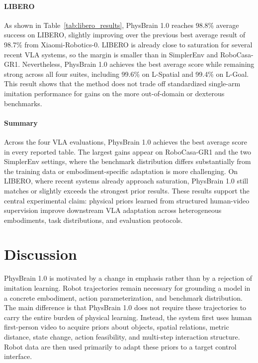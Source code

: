 \paragraph{LIBERO}
As shown in Table~\ref{tab:libero_results}, PhysBrain 1.0 reaches 98.8\% average success on LIBERO, slightly improving over the previous best average result of 98.7\% from Xiaomi-Robotics-0. LIBERO is already close to saturation for several recent VLA systems, so the margin is smaller than in SimplerEnv and RoboCasa-GR1. Nevertheless, PhysBrain 1.0 achieves the best average score while remaining strong across all four suites, including 99.6\% on L-Spatial and 99.4\% on L-Goal. This result shows that the method does not trade off standardized single-arm imitation performance for gains on the more out-of-domain or dexterous benchmarks.

\paragraph{Summary}
Across the four VLA evaluations, PhysBrain 1.0 achieves the best average score in every reported table. The largest gains appear on RoboCasa-GR1 and the two SimplerEnv settings, where the benchmark distribution differs substantially from the training data or embodiment-specific adaptation is more challenging. On LIBERO, where recent systems already approach saturation, PhysBrain 1.0 still matches or slightly exceeds the strongest prior results. These results support the central experimental claim: physical priors learned from structured human-video supervision improve downstream VLA adaptation across heterogeneous embodiments, task distributions, and evaluation protocols.




\section{Discussion}
\label{sec:discussion}

PhysBrain 1.0 is motivated by a change in emphasis rather than by a rejection of imitation learning. Robot trajectories remain necessary for grounding a model in a concrete embodiment, action parameterization, and benchmark distribution. The main difference is that PhysBrain 1.0 does not require these trajectories to carry the entire burden of physical learning. Instead, the system first uses human first-person video to acquire priors about objects, spatial relations, metric distance, state change, action feasibility, and multi-step interaction structure. Robot data are then used primarily to adapt these priors to a target control interface.

